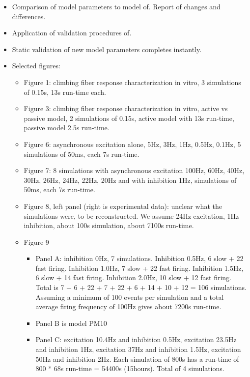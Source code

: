 \documentclass[12pt]{article}
\begin{document}
\begin{itemize}
  \begin{itemize}
  \item Comparison of model parameters to model
    of\cite{De-Schutter-E:1994vn}.  Report of changes and differences.
  \item Application of validation procedures
    of\cite{De-Schutter-E:1994vn}.
  \item Static validation of new model parameters completes instantly.
  \item Selected figures:
    \begin{itemize}
    \item Figure 1: climbing fiber response characterization in vitro,
      3 simulations of 0.15s, 13s run-time each.
    \item Figure 3: climbing fiber response characterization in vitro,
      active vs passive model, 2 simulations of 0.15s, active model
      with 13s run-time, passive model 2.5s run-time.
    \item Figure 6: asynchronous excitation alone, 5Hz, 3Hz, 1Hz, 0.5Hz,
      0.1Hz, 5 simulations of 50ms, each 7s run-time.
    \item Figure 7: 8 simulations with asynchronous excitation 100Hz,
      60Hz, 40Hz, 30Hz, 26Hz, 24Hz, 22Hz, 20Hz and with inhibition
      1Hz, simulations of 50ms, each 7s run-time.
    \item Figure 8, left panel (right is experimental data): unclear
      what the simulations were, to be reconstructed.  We assume 24Hz
      excitation, 1Hz inhibition, about 100s simulation, about 7100s
      run-time.
    \item Figure 9
      \begin{itemize}
      \item Panel A: inhibition 0Hz, 7 simulations.  Inhibition 0.5Hz,
        6 slow + 22 fast firing.  Inhibition 1.0Hz, 7 slow + 22 fast
        firing.  Inhibition 1.5Hz, 6 slow + 14 fast firing.
        Inhibition 2.0Hz, 10 slow + 12 fast firing.  Total is 7 + 6 +
        22 + 7 + 22 + 6 + 14 + 10 + 12 = 106 simulations.  Assuming a
        minimum of 100 events per simulation and a total average
        firing frequency of 100Hz gives about 7200s run-time.
      \item Panel B is model PM10
      \item Panel C: excitation 10.4Hz and inhibition 0.5Hz,
        excitation 23.5Hz and inhibition 1Hz, excitation 37Hz and
        inhibition 1.5Hz, excitation 50Hz and inhibition 2Hz.  Each
        simulation of 800s has a run-time of 800 * 68s run-time =
        54400s (15hours).  Total of 4 simulations.
      \end{itemize}
    \end{itemize}
  \end{itemize}


\end{itemize}
\end{document}
